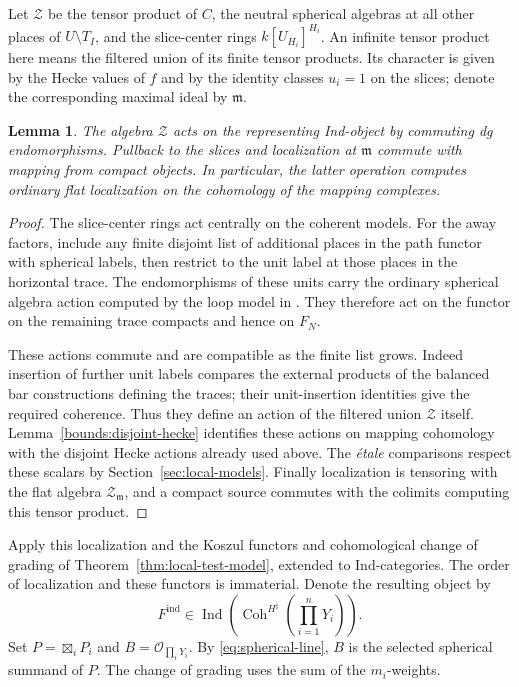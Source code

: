 \documentclass[11pt]{article}
\numberwithin{equation}{section}
\newtheorem{lemma}[theorem]{Lemma}
\theoremstyle{definition}
\theoremstyle{remark}
\newcommand{\Coh}{\operatorname{Coh}}
\newcommand{\Ind}{\operatorname{Ind}}
\begin{document}
Let $\mathcal Z$ be the tensor product of $C$, the neutral spherical
algebras at all other places of $U\setminus T_I$, and the slice-center
rings $k[U_{H_i}]^{H_i}$.  An infinite tensor product here means the
filtered union of its finite tensor products.  Its character is given
by the Hecke values of $f$ and by the identity classes $u_i=1$ on the
slices; denote the corresponding maximal ideal by $\mathfrak m$.

\begin{lemma}\label{bounds:central-actions}
The algebra $\mathcal Z$ acts on the representing Ind-object by
commuting dg endomorphisms.  Pullback to the slices and localization at
$\mathfrak m$ commute with mapping from compact objects.  In
particular, the latter operation computes ordinary flat localization
on the cohomology of the mapping complexes.
\end{lemma}

\begin{proof}
The slice-center rings act centrally on the coherent models.  For the
away factors, include any finite disjoint list of additional places
in the path functor with spherical labels, then restrict to the unit
label at those places in the horizontal trace.  The endomorphisms of
these units carry the ordinary spherical algebra action computed by
the loop model in \cite[Proposition~2.7]{Parent}.  They therefore act on
the functor on the remaining trace compacts and hence on $F_N$.

These actions commute and are compatible as the finite list grows.
Indeed insertion of further unit labels compares the external
products of the balanced bar constructions defining the traces;
their unit-insertion identities give the required coherence.  Thus
they define an action of the filtered union $\mathcal Z$ itself.
Lemma~\ref{bounds:disjoint-hecke} identifies these actions on mapping
cohomology with the disjoint Hecke actions already used above.
The \emph{\'etale} comparisons respect these scalars by
Section~\ref{sec:local-models}.  Finally localization is tensoring
with the flat algebra $\mathcal Z_{\mathfrak m}$, and a compact
source commutes with the colimits computing this tensor product.
\end{proof}

Apply this localization and the Koszul functors and cohomological
change of grading of Theorem~\ref{thm:local-test-model}, extended to
Ind-categories.  The order of localization and these functors is
immaterial.  Denote the resulting object by
\[
 F^{\mathrm{ind}}\in
 \Ind\!\left(\Coh^{H^\natural}\!\left(\prod_{i=1}^nY_i\right)\right).
\]
Set $P=\boxtimes_iP_i$ and $B=\mathcal O_{\prod_iY_i}$.
By \eqref{eq:spherical-line}, $B$ is the selected spherical summand
of $P$.  The change of grading uses the sum of the $m_i$-weights.
\end{document}
